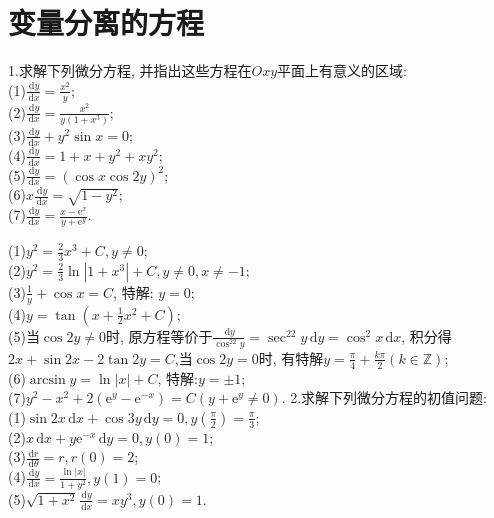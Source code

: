 \documentclass[titlepage,11pt,a4paper,twoside]{report}
\makeatletter
\newcommand\diff{\,\mathrm{d}}
\newcommand\e{\mathrm{e}}
\newenvironment{solve}{\par
	\pushQED{\qed}%
	\normalfont \topsep1\p@\@plus6\p@\relax
	\trivlist
	\item\relax
	{\hspace*{\parindent}{\heiti 解}\@addpunct{:}}\hspace\labelsep\ignorespaces
}{%
	\popQED\endtrivlist\@endpefalse
}
\makeatother
\begin{document}
\section{变量分离的方程}
1.求解下列微分方程, 并指出这些方程在$Oxy$平面上有意义的区域:\\
(1)$\displaystyle\frac{\diff y}{\diff x}=\frac{x^2}{y}$;\\
(2)$\displaystyle\frac{\diff y}{\diff x}=\frac{x^2}{y(1+x^3)}$;\\
(3)$\displaystyle\frac{\diff y}{\diff x}+y^2\sin x=0$;\\
(4)$\displaystyle\frac{\diff y}{\diff x}=1+x+y^2+xy^2$;\\
(5)$\displaystyle\frac{\diff y}{\diff x}=(\cos x\cos 2y)^2$;\\
(6)$\displaystyle x\frac{\diff y}{\diff x}=\sqrt{1-y^2}$;\\
(7)$\displaystyle\frac{\diff y}{\diff x}=\frac{x-\e^x}{y+\e^y}$.
\begin{solve}(1)$y^2=\frac{2}{3}x^3+C,y\neq0$;\\
(2)$y^2=\frac{2}{3}\ln|1+x^3|+C,y\neq0,x\neq-1$;\\
(3)$\frac{1}{y}+\cos x=C$, 特解: $y=0$;\\
(4)$y=\tan(x+\frac{1}{2}x^2+C)$;\\
(5)当$\cos 2y\neq0$时, 原方程等价于$\frac{\diff y}{\cos^22y}=\sec^22y\diff y=\cos^2x\diff x$, 积分得$2x+\sin2x-2\tan2y=C$,当$\cos2y=0$时, 有特解$y=\frac{\pi}{4}+\frac{k\pi}{2}(k\in\mathbb{Z})$;\\
(6)$\arcsin y=\ln|x|+C$, 特解:$y=\pm1$;\\
(7)$y^2-x^2+2(\e^y-\e^{-x})=C(y+\e^y\neq0)$.
\end{solve}
2.求解下列微分方程的初值问题:\\
(1)$\displaystyle\sin 2x\diff x+\cos 3y\diff y=0,y\left(\frac{\pi}{2}\right)=\frac{\pi}{3}$;\\
(2)$\displaystyle x\diff x+y\e^{-x}\diff y=0,y(0)=1$;\\
(3)$\displaystyle\frac{\diff r}{\diff\theta}=r,r(0)=2$;\\
(4)$\displaystyle\frac{\diff y}{\diff x}=\frac{\ln|x|}{1+y^2},y(1)=0$;\\
(5)$\displaystyle\sqrt{1+x^2}\frac{\diff y}{\diff x}=xy^3,y(0)=1$.
\end{document}

